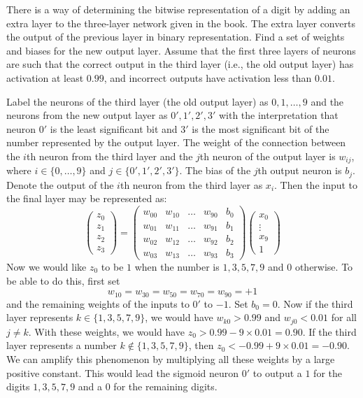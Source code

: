 \begin{exercise}
There is a way of determining the bitwise representation of a digit by adding
an extra layer to the three-layer network given in the book.  The extra layer
converts the output of the previous layer in binary representation. Find a set
of weights and biases for the new output layer.  Assume that the first three
layers of neurons are such that the correct output in the third layer (i.e.,
the old output layer) has activation at least $0.99$, and incorrect outputs
have activation less than $0.01$.
\end{exercise}
\begin{solution}
Label the neurons of the third layer (the old output layer) as $0, 1, \ldots, 9$
and the neurons from the new output layer as $0', 1', 2', 3'$ with the interpretation 
that neuron $0'$ is the least significant bit and $3'$ is the most significant 
bit of the number represented by the output layer. The weight of the 
connection between the $i$th neuron from the third layer and the $j$th neuron 
of the output layer is $w_{i j}$, where $i \in \{0, \ldots, 9\}$ and 
$j \in \{0', 1', 2', 3'\}$. The bias of the $j$th output neuron is $b_j$. Denote 
the output of the $i$th neuron from the third layer as $x_i$. Then the input to the
final layer may be represented as:
\[
    \begin{pmatrix}
        z_0 \\
        z_1 \\
        z_2 \\
        z_3 
    \end{pmatrix} = 
    \begin{pmatrix}
        w_{0 0} & w_{1 0} & \ldots & w_{9 0} & b_0 \\
        w_{0 1} & w_{1 1} & \ldots & w_{9 1} & b_1 \\
        w_{0 2} & w_{1 2} & \ldots & w_{9 2} & b_2 \\
        w_{0 3} & w_{1 3} & \ldots & w_{9 3} & b_3 
    \end{pmatrix} 
    \begin{pmatrix}
        x_0 \\
        \vdots \\
        x_9 \\
        1
    \end{pmatrix}
\]
Now we would like $z_0$ to be $1$ when the number is $1, 3, 5, 7, 9$ 
and $0$ otherwise. To be able to do this, first set 
\[ 
w_{1 0} = w_{3 0} = w_{5 0} = w_{7 0} = w_{9 0} = +1 
\]
and the remaining weights of the inputs to $0'$ to $-1$. Set $b_0 = 0$.
Now if the third layer represents $k \in \{1, 3, 5, 7, 9\}$, we would have 
$w_{k 0} > 0.99$ and $w_{j 0} < 0.01$ for all $j \neq k$. With these 
weights, we would have $z_0 > 0.99 - 9 \times 0.01 = 0.90$. If the third layer 
represents a number $k \notin \{1, 3, 5, 7, 9\}$, then 
$z_0 < -0.99 + 9 \times 0.01 = -0.90$. We can amplify this phenomenon by
multiplying all these weights by a large positive constant. This would lead
the sigmoid neuron $0'$ to output a $1$ for the digits $1, 3, 5, 7, 9$ and 
a $0$ for the remaining digits. 


\end{solution}
